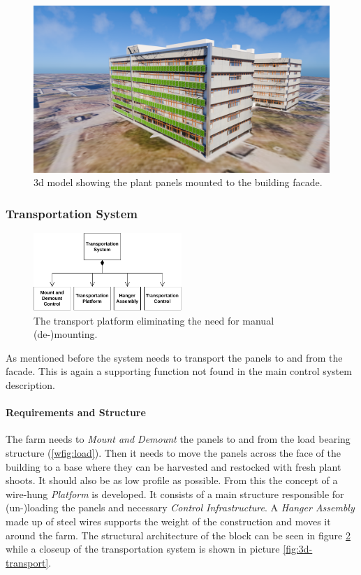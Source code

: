 \begin{figure}[htbp]
  \centering
  \includegraphics[width=\textwidth]{img/3d_model/3d-3-panels.png}
  \caption{3d model showing the plant panels mounted to the building facade.}
  \label{fig:3d-panels-on-building}
\end{figure}

\pagebreak

\subsubsection{Transportation System}
\begin{figure}
	\includegraphics[width=0.5\textwidth]{img/architecture/transport.pdf}
	\caption{The transport platform eliminating the need for manual (de-)mounting.}
	\label{wfig:transport}
\end{figure} 
As mentioned before the system needs to transport the panels to and from the facade.
This is again a supporting function not found in the main control system description.
\paragraph{Requirements and Structure}
The farm needs to \textit{Mount and Demount} the panels to and from the load bearing structure (\ref{wfig:load}).
Then it needs to move the panels across the face of the building to a base where they can be harvested and restocked with fresh plant shoots.
It should also be as low profile as possible.
From this the concept of a wire-hung \textit{Platform} is developed.
It consists of a main structure responsible for (un-)loading the panels and necessary \textit{Control Infrastructure}.
A \textit{Hanger Assembly} made up of steel wires supports the weight of the construction and moves it around the farm.
The structural architecture of the block can be seen in figure \ref{wfig:transport} while a closeup of the transportation system is shown in picture \ref{fig:3d-transport}.

